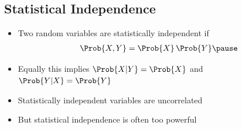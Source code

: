 
\begin{slide}
\section{Statistical Independence}

\begin{PauseHighLight}
  \begin{itemize}
  \item Two random variables are statistically independent if
    \begin{align*}
      \Prob{X,Y} = \Prob{X} \, \Prob{Y}\pause
    \end{align*}
  \item Equally this implies $\Prob{X|Y} = \Prob{X}$ and $\Prob{Y|X} =
    \Prob{Y}$\pause
  \item Statistically independent variables are uncorrelated\pause
  \item But statistical independence is often too powerful\pause
  \end{itemize}
\end{PauseHighLight}

\end{slide}


